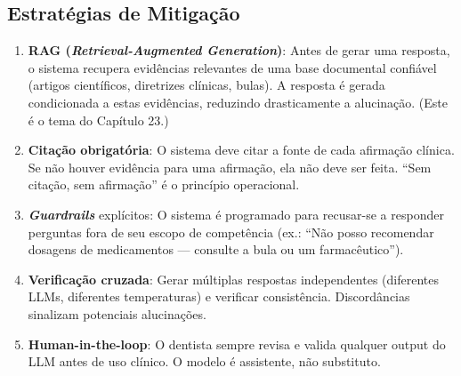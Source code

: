 
\subsection{Estratégias de Mitigação}

\begin{enumerate}
    \item \textbf{RAG (\textit{Retrieval-Augmented Generation})}: Antes de gerar uma resposta, o sistema recupera evidências relevantes de uma base documental confiável (artigos científicos, diretrizes clínicas, bulas). A resposta é gerada condicionada a estas evidências, reduzindo drasticamente a alucinação. (Este é o tema do Capítulo 23.)

    \item \textbf{Citação obrigatória}: O sistema deve citar a fonte de cada afirmação clínica. Se não houver evidência para uma afirmação, ela não deve ser feita. ``Sem citação, sem afirmação'' é o princípio operacional.

    \item \textbf{\textit{Guardrails}} explícitos: O sistema é programado para recusar-se a responder perguntas fora de seu escopo de competência (ex.: ``Não posso recomendar dosagens de medicamentos --- consulte a bula ou um farmacêutico'').
    
    \item \textbf{Verificação cruzada}: Gerar múltiplas respostas independentes (diferentes LLMs, diferentes temperaturas) e verificar consistência. Discordâncias sinalizam potenciais alucinações.

    \item \textbf{Human-in-the-loop}: O dentista sempre revisa e valida qualquer output do LLM antes de uso clínico. O modelo é assistente, não substituto.
\end{enumerate}

